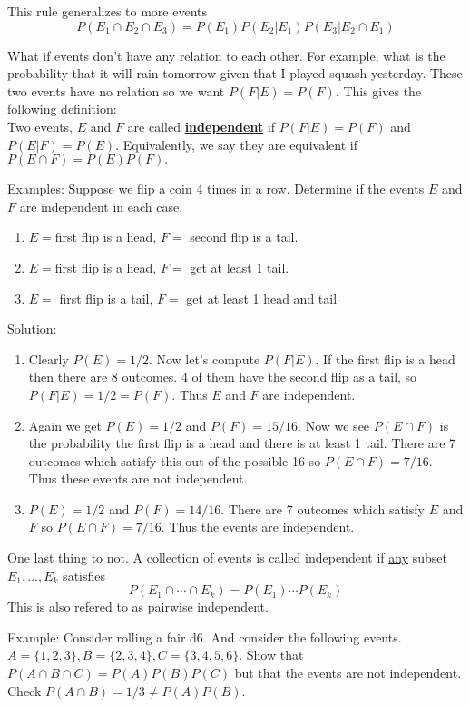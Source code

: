 \documentclass[14,fleqn]{article}
\newcommand{\defn}[1]{\textbf{\underline{#1}}}
\begin{document}
This rule generalizes to more events
\[
	P(E_1\cap E_2\cap E_3)=P(E_1)P(E_2|E_1)P(E_3|E_2\cap E_1)
\]

What if events don't have any relation to each other. For example, what is the probability that it will rain tomorrow given that I played squash yesterday. These two events have no relation so we want $P(F|E)=P(F).$ This gives the following definition:\\
Two events, $E$ and $F$ are called \defn{independent} if $P(F|E)=P(F)$ and $P(E|F)=P(E).$ Equivalently, we say they are equivalent if $P(E\cap F)=P(E)P(F).$

Examples: Suppose we flip a coin 4 times in a row. Determine if the events $E$ and $F$ are independent in each case.
\begin{enumerate}
	\item $E=$first flip is a head, $F=$ second flip is a tail.
	\item $E=$first flip is a head, $F=$ get at least 1 tail.
	\item $E=$ first flip is a tail, $F=$ get at least 1 head and tail
\end{enumerate}

Solution:\\
\begin{enumerate}
	\item Clearly $P(E)=1/2.$ Now let's compute $P(F|E).$ If the first flip is a head then there are 8 outcomes. 4 of them have the second flip as a tail, so $P(F|E)=1/2=P(F).$ Thus $E$ and $F$ are independent.
	\item Again we get $P(E)=1/2$ and $P(F)=15/16.$ Now we see $P(E\cap F)$ is the probability the first flip is a head and there is at least 1 tail. There are 7 outcomes which satisfy this out of the possible 16 so $P(E\cap F)=7/16.$ Thus these events are not independent.
	\item $P(E)=1/2$ and $P(F)=14/16.$ There are 7 outcomes which satisfy $E$ and $F$ so $P(E\cap F)=7/16.$ Thus the events are independent.
\end{enumerate}

One last thing to not. A collection of events is called independent if \underline{any} subset $E_1,\dots,E_k$ satisfies
\[
	P(E_1\cap \cdots \cap E_k)=P(E_1)\cdots P(E_k)
\]
This is also refered to as pairwise independent.

Example: Consider rolling a fair d6. And consider the following events. $A=\{1,2,3\},B=\{2,3,4\},C=\{3,4,5,6\}.$ Show that $P(A\cap B\cap C)=P(A)P(B)P(C)$ but that the events are not independent.\\

Check $P(A\cap B)=1/3\neq P(A)P(B).$
\end{document}
